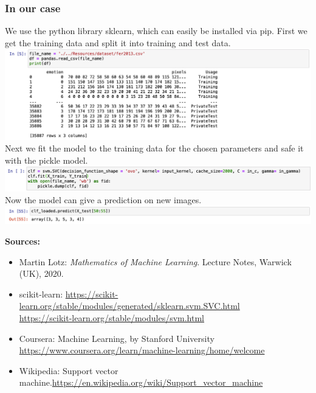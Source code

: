 \subsubsection{In our case}
We use the python library sklearn, which can easily be installed via pip.
First we get the training data and split it into training and test data.\\
\includegraphics[scale=0.4]{Images/trainingdata.png} \\
Next we fit the model to the training data for the chosen parameters and safe it with the pickle model. \\
\includegraphics[scale=0.4]{Images/trainmodel.png} \\
Now the model can give a prediction on new images. \\
\includegraphics[scale=0.4]{Images/svm_prediction.png}

\textbf{Sources:}
\begin{itemize}
\item Martin Lotz: \textit{Mathematics of Machine Learning}. Lecture Notes, Warwick (UK), 2020.
\item scikit-learn: \hyperlink{https://scikit-learn.org/stable/modules/generated/sklearn.svm.SVC.html}{https://scikit-learn.org/stable/modules/generated/sklearn.svm.SVC.html} \\
\hyperlink{https://scikit-learn.org/stable/modules/svm.html}{https://scikit-learn.org/stable/modules/svm.html}
\item Coursera: Machine Learning, by Stanford University \\ \hyperlink{https://www.coursera.org/learn/machine-learning/home/welcome}{https://www.coursera.org/learn/machine-learning/home/welcome}
\item Wikipedia: Support vector machine.\hyperlink{https://en.wikipedia.org/wiki/Support\_vector\_machine}{https://en.wikipedia.org/wiki/Support\_vector\_machine}
\end{itemize}


